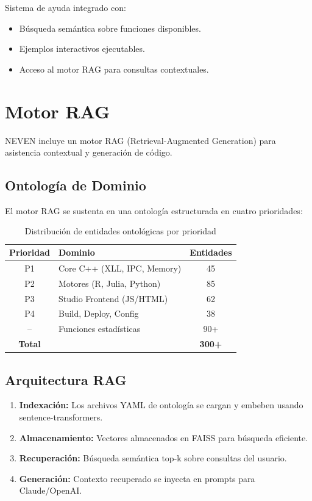 \documentclass[12pt, a4paper]{report}
\begin{document}
Sistema de ayuda integrado con:
\begin{itemize}
    \item Búsqueda semántica sobre funciones disponibles.
    \item Ejemplos interactivos ejecutables.
    \item Acceso al motor RAG para consultas contextuales.
\end{itemize}

\chapter{Motor RAG}

NEVEN incluye un motor RAG (Retrieval-Augmented Generation) para asistencia contextual y generación de código.

\section{Ontología de Dominio}

El motor RAG se sustenta en una ontología estructurada en cuatro prioridades:

\begin{table}[H]
\centering
\begin{tabular}{clc}
\toprule
\textbf{Prioridad} & \textbf{Dominio} & \textbf{Entidades} \\
\midrule
P1 & Core C++ (XLL, IPC, Memory) & 45 \\
P2 & Motores (R, Julia, Python) & 85 \\
P3 & Studio Frontend (JS/HTML) & 62 \\
P4 & Build, Deploy, Config & 38 \\
-- & Funciones estadísticas & 90+ \\
\midrule
\textbf{Total} & & \textbf{300+} \\
\bottomrule
\end{tabular}
\caption{Distribución de entidades ontológicas por prioridad}
\end{table}

\section{Arquitectura RAG}

\begin{enumerate}
    \item \textbf{Indexación:} Los archivos YAML de ontología se cargan y embeben usando sentence-transformers.
    \item \textbf{Almacenamiento:} Vectores almacenados en FAISS para búsqueda eficiente.
    \item \textbf{Recuperación:} Búsqueda semántica top-k sobre consultas del usuario.
    \item \textbf{Generación:} Contexto recuperado se inyecta en prompts para Claude/OpenAI.
\end{enumerate}
\end{document}
